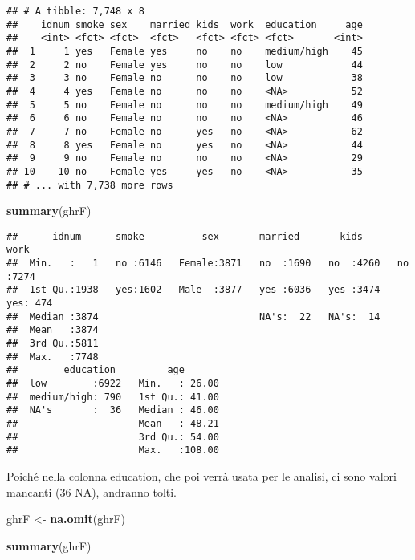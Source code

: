 \documentclass[]{article}
\newenvironment{Shaded}{\begin{snugshade}}{\end{snugshade}}
\newcommand{\KeywordTok}[1]{\textcolor[rgb]{0.13,0.29,0.53}{\textbf{#1}}}
\newcommand{\NormalTok}[1]{#1}
\newcommand{\StringTok}[1]{\textcolor[rgb]{0.31,0.60,0.02}{#1}}
\begin{document}
\begin{verbatim}
## # A tibble: 7,748 x 8
##    idnum smoke sex    married kids  work  education     age
##    <int> <fct> <fct>  <fct>   <fct> <fct> <fct>       <int>
##  1     1 yes   Female yes     no    no    medium/high    45
##  2     2 no    Female yes     no    no    low            44
##  3     3 no    Female no      no    no    low            38
##  4     4 yes   Female no      no    no    <NA>           52
##  5     5 no    Female no      no    no    medium/high    49
##  6     6 no    Female no      no    no    <NA>           46
##  7     7 no    Female no      yes   no    <NA>           62
##  8     8 yes   Female no      yes   no    <NA>           44
##  9     9 no    Female no      no    no    <NA>           29
## 10    10 no    Female yes     yes   no    <NA>           35
## # ... with 7,738 more rows
\end{verbatim}

\begin{Shaded}
\begin{Highlighting}[]
\KeywordTok{summary}\NormalTok{(ghrF)}
\end{Highlighting}
\end{Shaded}

\begin{verbatim}
##      idnum      smoke          sex       married       kids       work     
##  Min.   :   1   no :6146   Female:3871   no  :1690   no  :4260   no :7274  
##  1st Qu.:1938   yes:1602   Male  :3877   yes :6036   yes :3474   yes: 474  
##  Median :3874                            NA's:  22   NA's:  14             
##  Mean   :3874                                                              
##  3rd Qu.:5811                                                              
##  Max.   :7748                                                              
##        education         age        
##  low        :6922   Min.   : 26.00  
##  medium/high: 790   1st Qu.: 41.00  
##  NA's       :  36   Median : 46.00  
##                     Mean   : 48.21  
##                     3rd Qu.: 54.00  
##                     Max.   :108.00
\end{verbatim}

Poiché nella colonna education, che poi verrà usata per le analisi, ci
sono valori mancanti (36 NA), andranno tolti.

\begin{Shaded}
\begin{Highlighting}[]
\NormalTok{ghrF <-}\StringTok{ }\KeywordTok{na.omit}\NormalTok{(ghrF)}

\KeywordTok{summary}\NormalTok{(ghrF)}
\end{Highlighting}
\end{Shaded}
\end{document}
